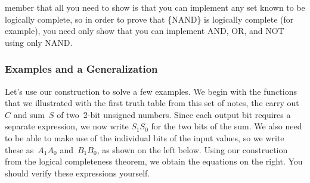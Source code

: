 member that all
you need to show is that you can implement any set known to be
logically complete, so in order to prove that \{NAND\} is 
logically complete (for example),
you need only show that you can implement AND, OR, and NOT using only
NAND.\\

\subsubsection{Examples and a Generalization}

Let's use our construction to solve a few examples.  We begin with
the functions that we illustrated with the first truth table from this
set of notes,
the carry out~$C$ and sum~$S$ of two~\mbox{2-bit}
unsigned numbers.  Since each output bit requires a separate expression,
we now write $S_1S_0$ for the two bits of the sum.  We also need to
be able to make use of the individual bits of the input values, so we 
write these as~$A_1A_0$ and~$B_1B_0$, as shown on the left below.
Using our 
construction from the logical completeness theorem, we obtain the
equations on the right.
You should verify these expressions yourself.\\

